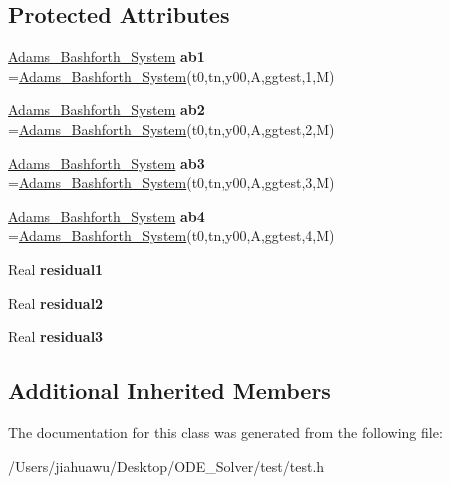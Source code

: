 \subsection*{Protected Attributes}
\begin{DoxyCompactItemize}
\item 
\mbox{\label{class_a_btest_a4271b70b720267e17d05482d70a4bb38}} 
\mbox{\hyperlink{class_adams___bashforth___system}{Adams\+\_\+\+Bashforth\+\_\+\+System}} {\bfseries ab1} =\mbox{\hyperlink{class_adams___bashforth___system}{Adams\+\_\+\+Bashforth\+\_\+\+System}}(t0,tn,y00,A,ggtest,1,M)
\item 
\mbox{\label{class_a_btest_a4cbe471075b88a3124289c94a9b014ff}} 
\mbox{\hyperlink{class_adams___bashforth___system}{Adams\+\_\+\+Bashforth\+\_\+\+System}} {\bfseries ab2} =\mbox{\hyperlink{class_adams___bashforth___system}{Adams\+\_\+\+Bashforth\+\_\+\+System}}(t0,tn,y00,A,ggtest,2,M)
\item 
\mbox{\label{class_a_btest_a50191ecb607907c50f17af824e04e0bb}} 
\mbox{\hyperlink{class_adams___bashforth___system}{Adams\+\_\+\+Bashforth\+\_\+\+System}} {\bfseries ab3} =\mbox{\hyperlink{class_adams___bashforth___system}{Adams\+\_\+\+Bashforth\+\_\+\+System}}(t0,tn,y00,A,ggtest,3,M)
\item 
\mbox{\label{class_a_btest_a939c7359bfe2b0c39591eea9b4a160a4}} 
\mbox{\hyperlink{class_adams___bashforth___system}{Adams\+\_\+\+Bashforth\+\_\+\+System}} {\bfseries ab4} =\mbox{\hyperlink{class_adams___bashforth___system}{Adams\+\_\+\+Bashforth\+\_\+\+System}}(t0,tn,y00,A,ggtest,4,M)
\item 
\mbox{\label{class_a_btest_a736a9e759acffaec7efd6a385e493054}} 
Real {\bfseries residual1}
\item 
\mbox{\label{class_a_btest_acf61ae3467e07312ee2922853659c44b}} 
Real {\bfseries residual2}
\item 
\mbox{\label{class_a_btest_a6f6fa4b1307401a2fe4a4dfbe829c9c8}} 
Real {\bfseries residual3}
\end{DoxyCompactItemize}
\subsection*{Additional Inherited Members}


The documentation for this class was generated from the following file\+:\begin{DoxyCompactItemize}
\item 
/\+Users/jiahuawu/\+Desktop/\+O\+D\+E\+\_\+\+Solver/test/test.\+h\end{DoxyCompactItemize}
